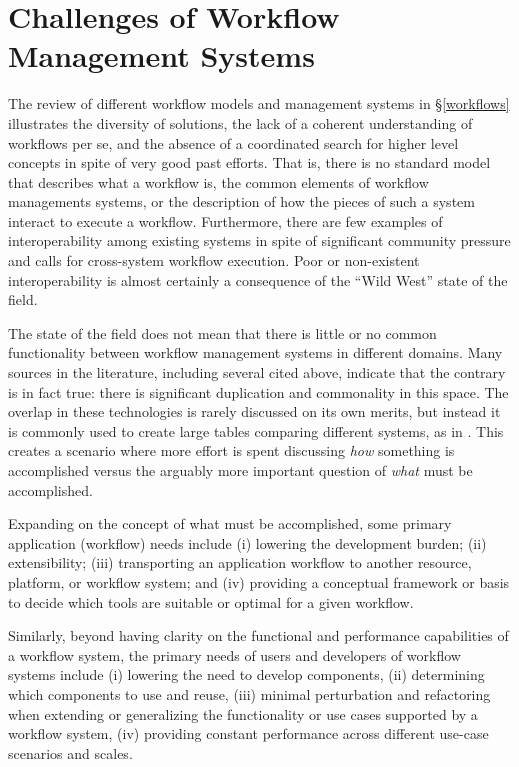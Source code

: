 
\section{Challenges of Workflow Management Systems}\label{commonFunc}

The review of different workflow models and management systems in
\S\ref{workflows} illustrates the diversity of solutions, the lack of a coherent
understanding of workflows per se, and the absence of a coordinated search for
higher level concepts in spite of very good past efforts. That is, there is no
standard model that describes what a workflow is, the common elements of
workflow managements systems, or the description of how the pieces of such a
system interact to execute a workflow. Furthermore, there are few examples of
interoperability among existing systems in spite of significant community
pressure and calls for cross-system workflow execution. Poor or non-existent
interoperability is almost certainly a consequence of the ``Wild West'' state of
the field.

The state of the field does not mean that there is little or no common
functionality between workflow management systems in different domains. Many
sources in the literature, including several cited above, indicate
that the contrary is in fact true: there is significant duplication and
commonality in this space. The overlap in these technologies is rarely discussed
on its own merits, but instead it is commonly used to create large tables
comparing different systems, as in
\cite{ferreira_da_silva_characterization_nodate}. This creates a scenario where
more effort is spent discussing \textit{how} something is accomplished
versus the arguably more important question of \textit{what} must be
accomplished. 

Expanding on the concept of what must be accomplished, some primary application (workflow) needs include
(i) lowering the development burden; (ii) extensibility; (iii) transporting an
application workflow to another resource, platform, or workflow system; and
(iv) providing a conceptual framework or basis to decide which tools are suitable or optimal for a given workflow.

Similarly, beyond having clarity on the functional and performance capabilities of a
workflow system, the primary needs of users and developers of workflow systems include (i) lowering the need to develop components, (ii) determining which components
to use and reuse, (iii) minimal perturbation and refactoring when extending or
generalizing the functionality or use cases supported by a workflow system,
(iv) providing constant performance across different use-case scenarios and
scales.

